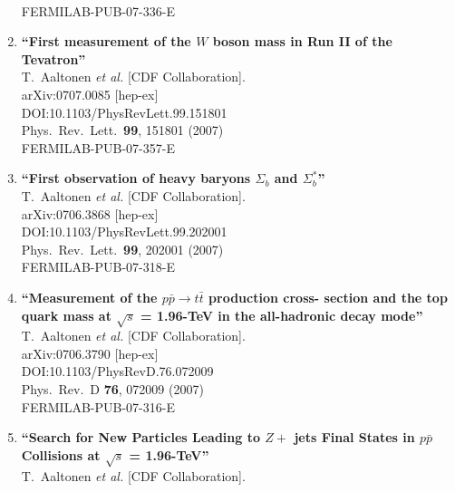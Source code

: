 \documentclass{article}
\begin{document}
\begin{enumerate}
  \\{}FERMILAB-PUB-07-336-E
\item%
{\bf ``First measurement of the $W$ boson mass in Run II of the Tevatron''}
  \\{}T.~Aaltonen {\it et al.} [CDF Collaboration].
  \\{}arXiv:0707.0085 [hep-ex]
  \\{}DOI:10.1103/PhysRevLett.99.151801
  \\{}Phys.\ Rev.\ Lett.\  {\bf 99}, 151801 (2007)
  \\{}FERMILAB-PUB-07-357-E
\item%
{\bf ``First observation of heavy baryons $\Sigma_{b}$ and $\Sigma_{b}^*$''}
  \\{}T.~Aaltonen {\it et al.} [CDF Collaboration].
  \\{}arXiv:0706.3868 [hep-ex]
  \\{}DOI:10.1103/PhysRevLett.99.202001
  \\{}Phys.\ Rev.\ Lett.\  {\bf 99}, 202001 (2007)
  \\{}FERMILAB-PUB-07-318-E
\item%
{\bf ``Measurement of the $p \bar{p} \to t \bar{t}$ production cross- section and the top quark mass at $\sqrt{s}$ = 1.96-TeV in the all-hadronic decay mode''}
  \\{}T.~Aaltonen {\it et al.} [CDF Collaboration].
  \\{}arXiv:0706.3790 [hep-ex]
  \\{}DOI:10.1103/PhysRevD.76.072009
  \\{}Phys.\ Rev.\ D {\bf 76}, 072009 (2007)
  \\{}FERMILAB-PUB-07-316-E
\item%
{\bf ``Search for New Particles Leading to $Z +$ jets Final States in $p \bar{p}$ Collisions at $\sqrt{s}$ = 1.96-TeV''}
  \\{}T.~Aaltonen {\it et al.} [CDF Collaboration].

\end{enumerate}
\end{document}
